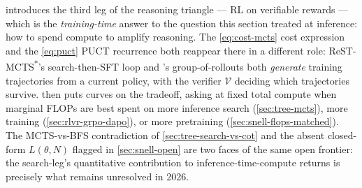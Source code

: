  introduces the third leg of the reasoning
triangle --- RL on verifiable rewards --- which is the
\emph{training-time} answer to the question this section treated at
inference: how to spend compute to amplify reasoning. The
\cref{eq:cost-mcts} cost expression and the \cref{eq:puct} PUCT
recurrence both reappear there in a different role: ReST-MCTS\textsuperscript{*}'s
search-then-SFT loop and 's group-of-rollouts both \emph{generate}
training trajectories from a current policy, with the verifier
$\mathcal{V}$ deciding which trajectories survive. 
then puts curves on the tradeoff, asking at fixed total compute when
marginal FLOPs are best spent on more inference search
(\cref{sec:tree-mcts}), more  training (\cref{sec:rlvr-grpo-dapo}),
or more pretraining (\cref{sec:snell-flops-matched}). The MCTS-vs-BFS
contradiction of \cref{sec:tree-search-vs-cot} and the absent
closed-form $L(\theta, N)$ flagged in \cref{sec:snell-open} are two
faces of the same open frontier: the search-leg's quantitative
contribution to inference-time-compute returns is precisely what
remains unresolved in 2026.
